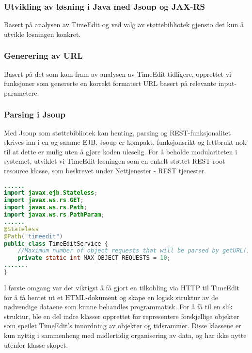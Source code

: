 \documentclass[../main.tex]{subfiles}
\begin{document}
\subsubsection{Utvikling av løsning i Java med Jsoup og JAX-RS}

Basert på analysen av TimeEdit og ved valg av støttebibliotek gjensto det kun å utvikle løsningen konkret. 

\subsubsection{Generering av URL}

Basert på det som kom fram av analysen av TimeEdit tidligere, opprettet vi funksjoner som genererte en korrekt formatert URL basert på relevante input-parametere.

\subsubsection{Parsing i Jsoup}
Med Jsoup som støttebibliotek kan henting, parsing og REST-funksjonalitet skrives inn i en og samme EJB. Jsoup er kompakt, funksjonsrikt og lettbrukt nok til at dette er mulig uten å gjøre koden uleselig. For å beholde modulariteten i systemet, utviklet vi TimeEdit-løsningen som en enkelt støttet REST root resource klasse, som beskrevet under Nettjenester - REST tjenester.

\begin{lstlisting}[language=Java, frame=single, caption={Kodesnipp fra klassen TimeEditService, som er grovt kortet ned.}]
......
import javax.ejb.Stateless;
import javax.ws.rs.GET;
import javax.ws.rs.Path;
import javax.ws.rs.PathParam;
......
@Stateless
@Path("timeedit")
public class TimeEditService {
    //Maximum number of object requests that will be parsed by getURL()
    private static int MAX_OBJECT_REQUESTS = 10;
.......
}
\end{lstlisting}

I første omgang var det viktigst å få gjort en tilkobling via HTTP til TimeEdit for å få hentet ut et HTML-dokument og skape en logisk struktur av de nødvendige dataene som kunne behandles programmatisk. For å få til en slik struktur, ble en del indre klasser opprettet for representere forskjellige objekter som speilet TimeEdit’s innordning av objekter og tidsrammer. Disse klassene er kun nyttig i sammenheng med midlertidig organisering av data, og har ikke nytte utenfor klasse-skopet.
\end{document}
